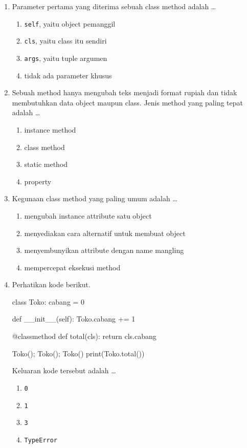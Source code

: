 \begin{enumerate}
  \item Parameter pertama yang diterima sebuah class method adalah \ldots
  \begin{enumerate}[label=\alph*.,itemsep=0pt]
    \item \texttt{self}, yaitu object pemanggil
    \item \texttt{cls}, yaitu class itu sendiri
    \item \texttt{args}, yaitu tuple argumen
    \item tidak ada parameter khusus
  \end{enumerate}

  \item Sebuah method hanya mengubah teks menjadi format rupiah dan tidak membutuhkan data object maupun class. Jenis method yang paling tepat adalah \ldots
  \begin{enumerate}[label=\alph*.,itemsep=0pt]
    \item instance method
    \item class method
    \item static method
    \item property
  \end{enumerate}

  \item Kegunaan class method yang paling umum adalah \ldots
  \begin{enumerate}[label=\alph*.,itemsep=0pt]
    \item mengubah instance attribute satu object
    \item menyediakan cara alternatif untuk membuat object
    \item menyembunyikan attribute dengan name mangling
    \item mempercepat eksekusi method
  \end{enumerate}

  \item Perhatikan kode berikut.
\begin{kode}[Soal 4]
class Toko:
    cabang = 0

    def __init__(self):
        Toko.cabang += 1

    @classmethod
    def total(cls):
        return cls.cabang

Toko(); Toko(); Toko()
print(Toko.total())
\end{kode}
  Keluaran kode tersebut adalah \ldots
  \begin{enumerate}[label=\alph*.,itemsep=0pt]
    \item \texttt{0}
    \item \texttt{1}
    \item \texttt{3}
    \item \texttt{TypeError}
  \end{enumerate}


\end{enumerate}
